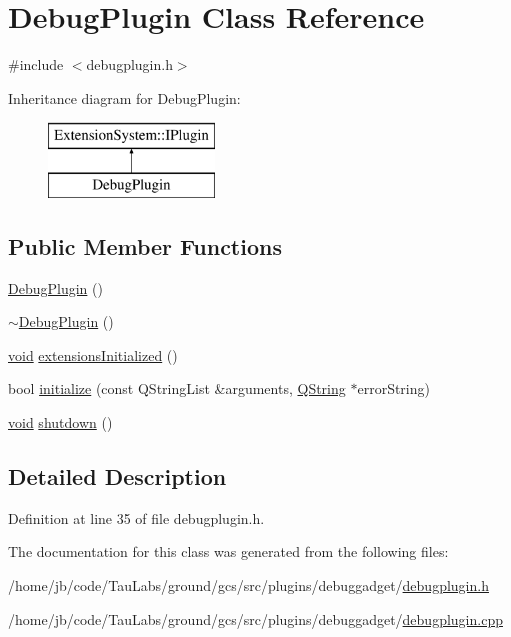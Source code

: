 \hypertarget{class_debug_plugin}{\section{\-Debug\-Plugin \-Class \-Reference}
\label{class_debug_plugin}
}


{\ttfamily \#include $<$debugplugin.\-h$>$}

\-Inheritance diagram for \-Debug\-Plugin\-:\begin{figure}[H]
\begin{center}
\leavevmode
\includegraphics[height=2.000000cm]{class_debug_plugin}
\end{center}
\end{figure}
\subsection*{\-Public \-Member \-Functions}
\begin{DoxyCompactItemize}
\item 
\hyperlink{group___debug_gadget_plugin_ga20c99d3ead7ff85b7fedc4e18a1e9a8b}{\-Debug\-Plugin} ()
\item 
\hyperlink{group___debug_gadget_plugin_gaf353390f1494d9cb3baaa804e8805854}{$\sim$\-Debug\-Plugin} ()
\item 
\hyperlink{group___u_a_v_objects_plugin_ga444cf2ff3f0ecbe028adce838d373f5c}{void} \hyperlink{group___debug_gadget_plugin_ga33da71812af948fb7295673fedc11e76}{extensions\-Initialized} ()
\item 
bool \hyperlink{group___debug_gadget_plugin_gac924db212f19bc55d62f1a821a234437}{initialize} (const \-Q\-String\-List \&arguments, \hyperlink{group___u_a_v_objects_plugin_gab9d252f49c333c94a72f97ce3105a32d}{\-Q\-String} $\ast$error\-String)
\item 
\hyperlink{group___u_a_v_objects_plugin_ga444cf2ff3f0ecbe028adce838d373f5c}{void} \hyperlink{group___debug_gadget_plugin_ga7239f7418bd69dfa8977fc1015656370}{shutdown} ()
\end{DoxyCompactItemize}


\subsection{\-Detailed \-Description}


\-Definition at line 35 of file debugplugin.\-h.



\-The documentation for this class was generated from the following files\-:\begin{DoxyCompactItemize}
\item 
/home/jb/code/\-Tau\-Labs/ground/gcs/src/plugins/debuggadget/\hyperlink{debugplugin_8h}{debugplugin.\-h}\item 
/home/jb/code/\-Tau\-Labs/ground/gcs/src/plugins/debuggadget/\hyperlink{debugplugin_8cpp}{debugplugin.\-cpp}\end{DoxyCompactItemize}
